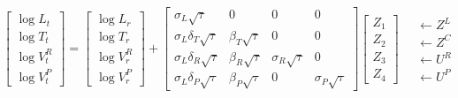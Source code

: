 \documentclass{article}
\begin{document}
\begin{align}\label{eqn:species_matrix}
\begin{bmatrix}
    \log L_t \\ \log T_t \\ \log V^R_t \\ \log V^P_t 
\end{bmatrix}
=
\begin{bmatrix}
    \log L_r \\ \log T_r \\ \log V^R_r \\ \log V^P_r 
\end{bmatrix}
+
\begin{bmatrix}
    \sigma_L \sqrt{\tau} &  0  & 0  & 0  \\
    \sigma_L \delta_T \sqrt{\tau}  &  \beta_T \sqrt{\tau}  & 0  &   0 \\
    \sigma_L \delta_R \sqrt{\tau}  &  \beta_R \sqrt{\tau}  & \sigma_R \sqrt{\tau}  &   0 \\
    \sigma_L \delta_P \sqrt{\tau}  &  \beta_P \sqrt{\tau}  & 0  &   \sigma_P\sqrt{\tau}  
\end{bmatrix}
\begin{bmatrix}
    Z_1 \\ Z_2 \\ Z_3 \\ Z_4
\end{bmatrix}
\quad \begin{matrix}
    \leftarrow Z^L \\
    \leftarrow Z^C \\
    \leftarrow U^R \\
    \leftarrow U^P 
\end{matrix}
\end{align}
\end{document}
